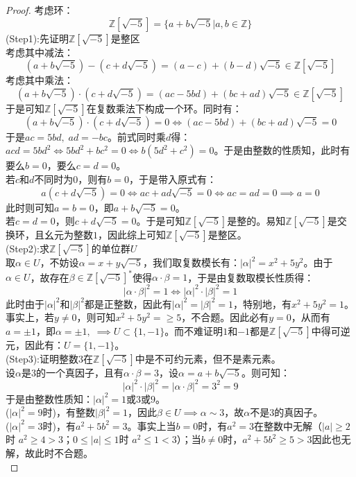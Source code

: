 \begin{proof}
考虑环：
\[
\mathbb{Z}[\sqrt{-5}]=\{a+b\sqrt{-5}|a,b\in \mathbb{Z}\}
\]
(Step1):先证明$\mathbb{Z}[\sqrt{-5}]$是整区\\
考虑其中减法：
\[
(a+b\sqrt{-5})-(c+d\sqrt{-5})=(a-c)+(b-d)\sqrt{-5}\in \mathbb{Z}[\sqrt{-5}]
\]
考虑其中乘法：
\[
(a+b\sqrt{-5})\cdot (c+d\sqrt{-5})=(ac-5bd)+(bc+ad)\sqrt{-5}\in \mathbb{Z}[\sqrt{-5}]
\]
于是可知$\mathbb{Z}[\sqrt{-5}]$在复数乘法下构成一个环。同时有：
\[
(a+b\sqrt{-5})\cdot (c+d\sqrt{-5})=0\iff (ac-5bd)+(bc+ad)\sqrt{-5}=0
\]
\indent 于是$ac=5bd,\; ad=-bc$。前式同时乘$d$得：$acd=5bd^2\iff 5bd^2+bc^2=0\iff b(5d^2+c^2)=0$。于是由整数的性质知，此时有要么$b=0$，要么$c=d=0$。\\
\indent 若$c$和$d$不同时为0，则有$b=0$，于是带入原式有：
\[
a(c+d\sqrt{-5})=0\iff ac+ad\sqrt{-5}=0\iff ac=ad=0\implies a=0
\]
此时则可知$a=b=0$，即$a+b\sqrt{-5}=0$。\\
\indent 若$c=d=0$，则$c+d\sqrt{-5}=0$。于是可知$\mathbb{Z}[\sqrt{-5}]$是整的。易知$\mathbb{Z}[\sqrt{-5}]$是交换环，且幺元为整数$1$，因此综上可知$\mathbb{Z}[\sqrt{-5}]$是整区。\\
(Step2):求$\mathbb{Z}[\sqrt{-5}]$的单位群$U$\\
\indent 取$\alpha\in U$，不妨设$\alpha=x+y\sqrt{-5}$，我们取复数模长有：${|\alpha|}^2=x^2+5y^2$。由于$\alpha\in U$，故存在$\beta\in {\mathbb{Z}[\sqrt{-5}]}^*$使得$\alpha\cdot \beta=1$，于是由复数取模长性质得：
\[
{|\alpha\cdot \beta|}^2=1\iff {|\alpha|}^2\cdot{|\beta|}^2=1
\]
\indent 此时由于${|\alpha|}^2$和${|\beta|}^2$都是正整数，因此有${|\alpha|}^2={|\beta|}^2=1$，特别地，有$x^2+5y^2=1$。事实上，若$y\neq 0$，则可知$x^2+5y^2=\geq 5$，不合题。因此必有$y=0$，从而有$a=\pm 1$，即$\alpha=\pm 1,\; \implies U\subset\{1,-1\}$。而不难证明$1$和$-1$都是$\mathbb{Z}[\sqrt{-5}]$中得可逆元，因此有：$U=\{1,-1\}$。\\
(Step3):证明整数$3$在$\mathbb{Z}[\sqrt{-5}]$中是不可约元素，但不是素元素。\\
\indent 设$\alpha$是$3$的一个真因子，且有$\alpha\cdot \beta=3$，设$\alpha=a+b\sqrt{-5}$。则可知：
\[
{|\alpha|}^2\cdot{|\beta|}^2={|\alpha\cdot \beta|}^2=3^2=9
\]
于是由整数性质知：${|\alpha|}^2=1$或$3$或$9$。\\
(${|\alpha|}^2=9$时)，有整数${|\beta|}^2=1$，因此$\beta\in U\implies \alpha\sim 3$，故$\alpha$不是$3$的真因子。\\
(${|\alpha|}^2=3$时)，有$a^2+5b^2=3$。事实上当$b=0$时，有$a^2=3$在整数中无解（$|a|\geq 2$时 $a^2\geq 4>3$；$0\leq |a|\leq 1$时 $a^2\leq 1<3$）；当$b\neq 0$时，$a^2+5b^2\geq 5>3$因此也无解，故此时不合题。\\

\end{proof}
